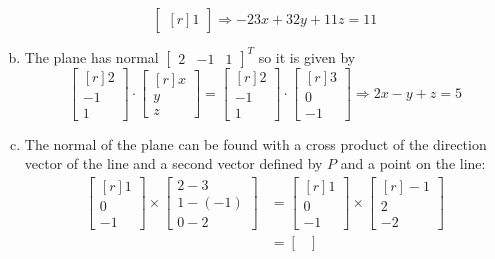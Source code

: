 \documentclass[../main.tex]{subfiles}
\begin{document}
\begin{enumerate}[a)]
\[\begin{bmatrix*}[r]
				1
			\end{bmatrix*}
			\Rightarrow
			-23x + 32y + 11z = 11
		\]
	\setcounter{enumi}{3}
	\item The plane has normal $\begin{bmatrix}2&-1&1\end{bmatrix}^T$ so it is given by
		\[
			\begin{bmatrix*}[r]
				2 \\
				-1 \\
				1
			\end{bmatrix*}
			\cdot
			\begin{bmatrix*}[r]
				x \\
				y \\
				z
			\end{bmatrix*}
			=
			\begin{bmatrix*}[r]
				2 \\
				-1 \\
				1
			\end{bmatrix*}
			\cdot
			\begin{bmatrix*}[r]
				3 \\
				0 \\
				-1
			\end{bmatrix*}
			\Rightarrow
			2x - y + z = 5
		\]
	\setcounter{enumi}{5}
	\item The normal of the plane can be found with a cross product of the direction vector of the line and a second vector defined by $P$ and a point on the line:
		\begin{align*}
			\begin{bmatrix*}[r]
				1 \\
				0 \\
				-1
			\end{bmatrix*}
			\times
			\begin{bmatrix}
				2 - 3 \\
				1 - (-1) \\
				0 - 2
			\end{bmatrix}
			&=
			\begin{bmatrix*}[r]
				1 \\
				0 \\
				-1
			\end{bmatrix*}
			\times
			\begin{bmatrix*}[r]
				-1 \\
				2 \\
				-2
			\end{bmatrix*}
			\\&=
			\begin{bmatrix}

\end{bmatrix}
\end{align*}
\end{enumerate}
\end{document}
